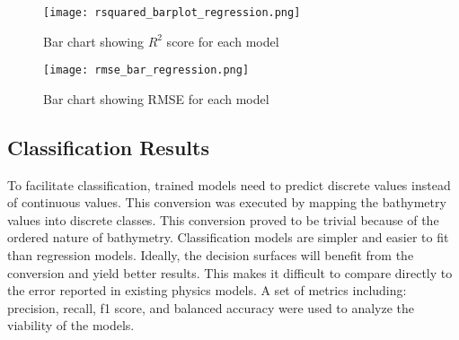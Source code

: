 \begin{figure}[htp]
    \centering
    \texttt{[image: rsquared\_barplot\_regression.png]}
    \caption{Bar chart showing \(R^2\) score for each model}
    \label{fig:r2_barplot_regression}
\end{figure}

\begin{figure}[htp]
    \centering
    \texttt{[image: rmse\_bar\_regression.png]} 
    \caption{Bar chart showing RMSE for each model}
    \label{fig:rmse_barplot_regression}
\end{figure}


\subsection{Classification Results}
\setlength{\parindent}{10ex}
To facilitate classification, trained models need to predict discrete values instead of continuous values.
This conversion was executed by mapping the bathymetry values into discrete classes.
This conversion proved to be trivial because of the ordered nature of bathymetry.
Classification models are simpler and easier to fit than regression models.
Ideally, the decision surfaces will benefit from the conversion and yield better results.
This makes it difficult to compare directly to the error reported in existing physics models.
A set of metrics including: precision, recall, f1 score, and balanced accuracy were used to analyze the viability of the models.

